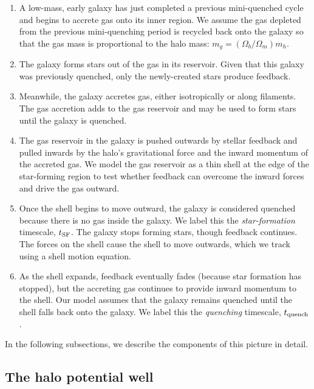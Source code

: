 \documentclass[a4paper,11pt]{article}
\begin{document}
\begin{enumerate}
    \item A low-mass, early galaxy has just completed a previous mini-quenched cycle and begins to accrete gas onto its inner region. We assume the gas depleted from the previous mini-quenching period is recycled back onto the galaxy so that the gas mass is proportional to the halo mass: $m_{g} = (\Omega_{b}/\Omega_{m}) m_{h}$.

    \item The galaxy forms stars out of the gas in its reservoir. Given that this galaxy was previously quenched, only the newly-created stars produce feedback.

    \item Meanwhile, the galaxy accretes gas, either isotropically or along filaments. The gas accretion adds to the gas reservoir and may be used to form stars until the galaxy is quenched.

    \item The gas reservoir in the galaxy is pushed outwards by stellar feedback and pulled inwards by the halo's gravitational force and the inward momentum of the accreted gas. We model the gas reservoir as a thin shell at the edge of the star-forming region to test whether feedback can overcome the inward forces and drive the gas outward. 

    \item Once the shell begins to move outward, the galaxy is considered quenched because there is no gas inside the galaxy. We label this the \textit{star-formation} timescale, $t_{\rm SF}$. The galaxy stops forming stars, though feedback continues. The forces on the shell cause the shell to move outwards, which we track using a shell motion equation. 
    
    \item As the shell expands, feedback eventually fades (because star formation has stopped), but the accreting gas continues to provide inward momentum to the shell. Our model assumes that the galaxy remains quenched until the shell falls back onto the galaxy. We label this the \textit{quenching} timescale, $t_{\rm quench}$.
\end{enumerate}
%
In the following subsections, we describe the components of this picture in detail.

\subsection{The halo potential well}
\end{document}
